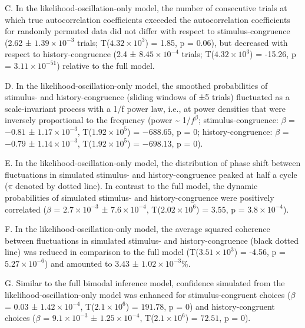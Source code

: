 \documentclass[
]{article}
\begin{document}
C. In the likelihood-oscillation-only model, the number of consecutive
trials at which true autocorrelation coefficients exceeded the
autocorrelation coefficients for randomly permuted data did not differ
with respect to stimulus-congruence (2.62 ±
\ensuremath{1.39\times 10^{-3}} trials;
T(\ensuremath{4.32\times 10^{3}}) = 1.85, p = \(0.06\)), but decreased
with respect to history-congruence (2.4 ±
\ensuremath{8.45\times 10^{-4}} trials;
T(\ensuremath{4.32\times 10^{3}}) = -15.26, p =
\(\ensuremath{3.11\times 10^{-51}}\)) relative to the full model.

D. In the likelihood-oscillation-only model, the smoothed probabilities
of stimulus- and history-congruence (sliding windows of ±5 trials)
fluctuated as a scale-invariant process with a 1/f power law, i.e., at
power densities that were inversely proportional to the frequency (power
\textasciitilde{} 1/\(f^\beta\); stimulus-congruence: \(\beta\) =
\(-0.81\) ± \(\ensuremath{1.17\times 10^{-3}}\),
T(\(\ensuremath{1.92\times 10^{5}}\)) = \(-688.65\), p = \(0\);
history-congruence: \(\beta\) = \(-0.79\) ±
\(\ensuremath{1.14\times 10^{-3}}\),
T(\(\ensuremath{1.92\times 10^{5}}\)) = \(-698.13\), p = \(0\)).

E. In the likelihood-oscillation-only model, the distribution of phase
shift between fluctuations in simulated stimulus- and history-congruence
peaked at half a cycle (\(\pi\) denoted by dotted line). In contrast to
the full model, the dynamic probabilities of simulated stimulus- and
history-congruence were positively correlated (\(\beta\) =
\(\ensuremath{2.7\times 10^{-3}}\) ± \(\ensuremath{7.6\times 10^{-4}}\),
T(\(\ensuremath{2.02\times 10^{6}}\)) = \(3.55\), p =
\(\ensuremath{3.8\times 10^{-4}}\)).

F. In the likelihood-oscillation-only model, the average squared
coherence between fluctuations in simulated stimulus- and
history-congruence (black dotted line) was reduced in comparison to the
full model (T(\ensuremath{3.51\times 10^{3}}) = -4.56, p =
\(\ensuremath{5.27\times 10^{-6}}\)) and amounted to 3.43 ±
\ensuremath{1.02\times 10^{-3}}\%.

G. Similar to the full bimodal inference model, confidence simulated
from the likelihood-oscillation-only model was enhanced for
stimulus-congruent choices (\(\beta\) = \(0.03\) ±
\(\ensuremath{1.42\times 10^{-4}}\),
T(\(\ensuremath{2.1\times 10^{6}}\)) = \(191.78\), p = \(0\)) and
history-congruent choices (\(\beta\) =
\(\ensuremath{9.1\times 10^{-3}}\) ±
\(\ensuremath{1.25\times 10^{-4}}\),
T(\(\ensuremath{2.1\times 10^{6}}\)) = \(72.51\), p = \(0\)).
\end{document}
